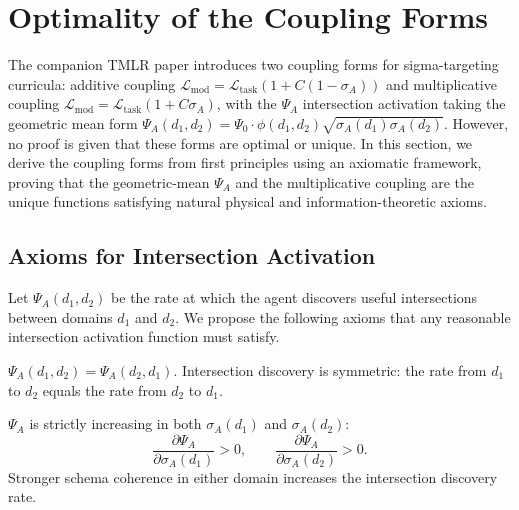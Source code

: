 
\section{Optimality of the Coupling Forms}
\label{sec:coupling}

The companion TMLR paper introduces two coupling forms for
sigma-targeting curricula: additive coupling
$\mathcal{L}_{\mathrm{mod}} = \mathcal{L}_{\mathrm{task}} (1 + C(1 - \sigma_A))$
and multiplicative coupling
$\mathcal{L}_{\mathrm{mod}} = \mathcal{L}_{\mathrm{task}} (1 + C \sigma_A)$,
with the $\Psi_A$ intersection activation taking the geometric mean form
$\Psi_A(d_1,d_2) = \Psi_0 \cdot \phi(d_1,d_2) \sqrt{\sigma_A(d_1) \sigma_A(d_2)}$.
However, no proof is given that these forms are optimal or unique. In this
section, we derive the coupling forms from first principles using an
axiomatic framework, proving that the geometric-mean $\Psi_A$ and the
multiplicative coupling are the unique functions satisfying natural
physical and information-theoretic axioms.

\subsection{Axioms for Intersection Activation}

Let $\Psi_A(d_1, d_2)$ be the rate at which the agent discovers useful
intersections between domains $d_1$ and $d_2$. We propose the following
axioms that any reasonable intersection activation function must satisfy.

\begin{axiom}[Symmetry]
\label{ax:symmetry}
$\Psi_A(d_1, d_2) = \Psi_A(d_2, d_1)$.
Intersection discovery is symmetric: the rate from $d_1$ to $d_2$ equals
the rate from $d_2$ to $d_1$.
\end{axiom}

\begin{axiom}
\label{ax:monotonicity}
$\Psi_A$ is strictly increasing in both $\sigma_A(d_1)$ and $\sigma_A(d_2)$:
\[
\frac{\partial \Psi_A}{\partial \sigma_A(d_1)} > 0,
\qquad
\frac{\partial \Psi_A}{\partial \sigma_A(d_2)} > 0.
\]
Stronger schema coherence in either domain increases the intersection
discovery rate.
\end{axiom}

